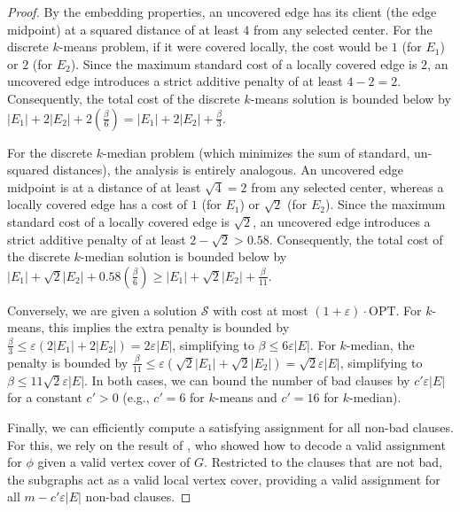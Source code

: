 \documentclass[11pt]{article}
\newcommand{\eps}{\varepsilon}
\newcommand{\calS}{\mathcal {S}}
\begin{document}
\begin{proof}
By the embedding properties, an uncovered edge has its client (the edge midpoint) at a squared distance of at least $4$ from any selected center. For the discrete $k$-means problem, if it were covered locally, the cost would be $1$ (for $E_1$) or $2$ (for $E_2$). Since the maximum standard cost of a locally covered edge is $2$, an uncovered edge introduces a strict additive penalty of at least $4 - 2 = 2$. Consequently, the total cost of the discrete $k$-means solution is bounded below by $|E_1| + 2|E_2| + 2\left(\frac{\beta}{6}\right) = |E_1| + 2|E_2| + \frac{\beta}{3}$.

For the discrete $k$-median problem (which minimizes the sum of standard, un-squared distances), the analysis is entirely analogous. An uncovered edge midpoint is at a distance of at least $\sqrt{4} = 2$ from any selected center, whereas a locally covered edge has a cost of $1$ (for $E_1$) or $\sqrt{2}$ (for $E_2$). Since the maximum standard cost of a locally covered edge is $\sqrt{2}$, an uncovered edge introduces a strict additive penalty of at least $2 - \sqrt{2} > 0.58$. Consequently, the total cost of the discrete $k$-median solution is bounded below by $|E_1| + \sqrt{2}|E_2| + 0.58\left(\frac{\beta}{6}\right) \ge |E_1| + \sqrt{2}|E_2| + \frac{\beta}{11}$.

Conversely, we are given a solution $\calS$ with cost at most $(1+\eps) \cdot \text{OPT}$. 
For $k$-means, this implies the extra penalty is bounded by $\frac{\beta}{3} \leq \eps(2|E_1| + 2|E_2|) = 2\eps |E|$, simplifying to $\beta \leq 6\eps |E|$. 
For $k$-median, the penalty is bounded by $\frac{\beta}{11} \leq \eps(\sqrt{2}|E_1| + \sqrt{2}|E_2|) = \sqrt{2}\eps |E|$, simplifying to $\beta \leq 11\sqrt{2}\eps |E|$. 
In both cases, we can bound the number of bad clauses by $c'\eps|E|$ for a constant $c' > 0$ (e.g., $c'=6$ for $k$-means and $c'=16$ for $k$-median).

Finally, we can efficiently compute a satisfying assignment for all non-bad clauses. For this, we rely on the result of \cite{BergBKMZ20}, who showed how to decode a valid assignment for $\phi$ given a valid vertex cover of $G$. Restricted to the clauses that are not bad, the subgraphs act as a valid local vertex cover, providing a valid assignment for all $m - c'\eps |E|$ non-bad clauses.
\end{proof}
\end{document}
